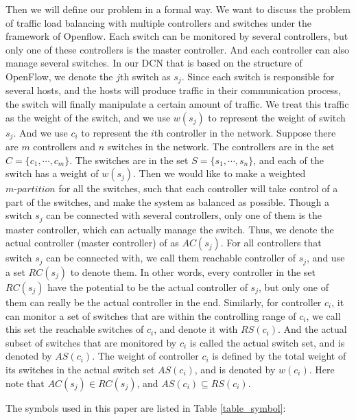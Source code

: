 Then we will define our problem in a formal way. We want to discuss the problem of traffic load balancing with multiple controllers and switches under the framework of Openflow. Each switch can be monitored by several controllers, but only one of these controllers is the master controller. And each controller can also manage several switches. In our DCN that is based on the structure of OpenFlow, we denote the $j$th switch as $s_j$. Since each switch is responsible for several hosts, and the hosts will produce traffic in their communication process, the switch will finally manipulate a certain amount of traffic. We treat this traffic as the weight of the switch, and we use $w(s_j)$ to represent the weight of switch $s_j$. And we use $c_i$ to represent the $i$th controller in the network. Suppose there are $m$ controllers and $n$ switches in the network. The controllers are in the set $C=\{c_1,\cdots,c_m\}$. The switches are in the set $S=\{s_1,\cdots,s_n\}$, and each of the switch has a weight of $w(s_j)$.  Then we would like to make a weighted $m\mbox{-}partition$ for all the switches, such that each controller will take control of a part of the switches, and make the system as balanced as possible. Though a switch $s_j$ can be connected with several controllers, only one of them is the master controller, which can actually manage the switch. Thus, we denote the actual controller (master controller) of as $AC(s_j)$. For all  controllers that switch $s_j$ can be connected with, we call them reachable controller of $s_j$, and use a set $RC(s_j)$ to denote them. In other words, every controller in the set $RC(s_j)$ have the potential to be the actual controller of $s_j$, but only one of them can really be the actual controller in the end. Similarly, for controller $c_i$, it can monitor a set of switches that are within the controlling range of $c_i$, we call this set the reachable switches of $c_i$, and denote it with $RS(c_i)$. And the actual subset of switches that are monitored by $c_i$ is called the actual switch set, and is denoted by $AS(c_i)$. The weight of controller $c_i$ is defined by the total weight of its switches in the actual switch set $AS(c_i)$, and is denoted by $w(c_i)$. Here note that $AC(s_j) \in RC(s_j)$, and $AS(c_i) \subseteq RS(c_i)$.

The symbols used in this paper are listed in Table \ref{table_symbol}: 

